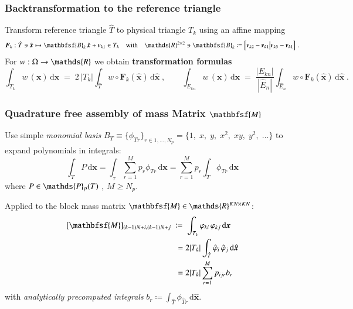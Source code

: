 \documentclass[final,12pt]{beamer}
\newcommand{\IP}{\ensuremath\mathds{P}}
\newcommand{\IR}{\ensuremath\mathds{R}}
\newcommand*{\vphi}{\varphi}                                     %
\renewcommand*{\vec}[1]{{\boldsymbol{#1}}}                       %
\newcommand*{\vecc}[1]{\mathbfsf{#1}}                            %
\newcommand*{\dd}{\mathrm{d}}                                    %
\begin{document}
\begin{frame}
\frametitle{Backtransformation to the reference triangle}
  \begin{center}\large
    
  \end{center}

  Transform reference triangle $\hat{T}$ to physical triangle $T_k$ using an affine mapping
  \begin{equation*}
    \vec{F}_k : \hat{T} \ni \hat{\vec{x}} \mapsto \vecc{B}_k \, \hat{\vec{x}} + \vec{v}_{k1} \in T_k
    \quad\text{with}\quad
    \IR^{2\times2} \ni \vecc{B}_k\coloneqq\Big[ \vec{v}_{k2}-\vec{v}_{k1} \big| \vec{v}_{k3}-\vec{v}_{k1}\Big]\;.
  \end{equation*}
  \vfill
  For $w : \Omega \rightarrow \IR$ we obtain \textbf{transformation formulas}
  \begin{equation*}
    \int_{T_k} w\,(\vec{x})\, \dd \vec{x} \;=\; 2\,|T_k|\int_{\hat{T}} w \circ \vec{F}_k (\hat{\vec{x}})\, \dd \hat{\vec{x}}\;, \qquad
    \int_{E_{kn}} w\,(\vec{x})\, \dd \vec{x} \;=\; \frac{|E_{kn}|}{|\hat{E}_n|}
    \int_{\hat{E}_n} w \circ \vec{F}_k (\hat{\vec{x}})\, \dd \hat{\vec{x}}\;.
  \end{equation*}
\end{frame}

\begin{frame}
  \frametitle{Quadrature free assembly of mass Matrix \(\vecc{M}\)}
  Use simple \emph{monomial basis} \(B_T^{} \equiv \{\phi_{Tr}^{}\}_{r\in 1,\dots ,N_p} %
  = \{1,\;x,\;y,\;x^2,\;xy,\;y^2,\;\dots\}\)
  to expand polynomials in integrals:
  \begin{equation*}
    \int_{T}P\,\dd\vec{x} = \int_{_T}\sum_{r=1}^Mp_{r}^{}\phi_{Tr}^{}\,\dd\vec{x} = \sum_{r=1}^Mp_{r}^{}\int_T\phi_{Tr}^{}\,\dd\vec{x}
  \end{equation*}
  where \(P\in \IP_p(T)\)%
  , \(M\geq N_p\).
  \vspace*{\fill}

  \pause
  Applied to the block mass matrix \(\vecc{M} \in \IR^{KN\times KN}\):
  \begin{equation*}
    \begin{split}
      [\vecc{M}]_{(k-1)N+i,(k-1)N+j} \;&\coloneqq\; \int_{T_k} \vphi_{ki} \, \vphi_{kj} \, \dd\vec{x}\\
      &\;= 2|T_k| \int_{\hat T}\hat \vphi_i\,\hat \vphi_j\, \dd\vec{\hat x}\\
      &\;= 2|T_k| \sum_{r=1}^{M}p_{ijr}b_r
    \end{split}
  \end{equation*}
  with \emph{analytically precomputed integrals} \(b_r \coloneqq \int_{\hat{T}}\phi_{\hat{T}r}^{}\,\dd\vec{\hat{x}} \).
\end{frame}
\end{document}
